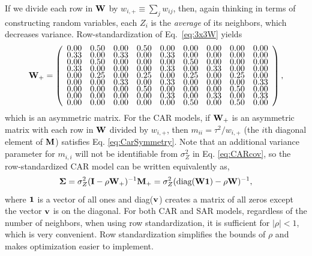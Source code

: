 \documentclass[11pt, titlepage]{article}\usepackage[]{graphicx}\usepackage[]{color}
\begin{document}
\begin{spacing}{1.9}
\begin{flushleft}
If we divide each row in $\mathbf{W}$ by $w_{i,+} \equiv \sum_j w_{ij}$, then, again thinking in terms of constructing random variables, each $Z_i$ is the \textit{average} of its neighbors, which decreases variance. Row-standardization of Eq.~\ref{eq:3x3W} yields
\begin{equation} \label{eq:W9plus}
\renewcommand\arraystretch{.5}
\bW_+ = \left(
\begin{array}{ccccccccc}
 0.00 & 0.50 & 0.00 & 0.50 & 0.00 & 0.00 & 0.00 & 0.00 & 0.00 \\ 
  0.33 & 0.00 & 0.33 & 0.00 & 0.33 & 0.00 & 0.00 & 0.00 & 0.00 \\ 
  0.00 & 0.50 & 0.00 & 0.00 & 0.00 & 0.50 & 0.00 & 0.00 & 0.00 \\ 
  0.33 & 0.00 & 0.00 & 0.00 & 0.33 & 0.00 & 0.33 & 0.00 & 0.00 \\ 
  0.00 & 0.25 & 0.00 & 0.25 & 0.00 & 0.25 & 0.00 & 0.25 & 0.00 \\ 
  0.00 & 0.00 & 0.33 & 0.00 & 0.33 & 0.00 & 0.00 & 0.00 & 0.33 \\ 
  0.00 & 0.00 & 0.00 & 0.50 & 0.00 & 0.00 & 0.00 & 0.50 & 0.00 \\ 
  0.00 & 0.00 & 0.00 & 0.00 & 0.33 & 0.00 & 0.33 & 0.00 & 0.33 \\ 
  0.00 & 0.00 & 0.00 & 0.00 & 0.00 & 0.50 & 0.00 & 0.50 & 0.00 \\ 
  
\end{array}
\right),
\end{equation}
which is an asymmetric matrix. For the CAR models, if $\mathbf{W}_+$ is an asymmetric matrix with each row in $\mathbf{W}$ divided by $w_{i,+}$, then $m_{ii} = \tau^2/w_{i,+}$ (the $i$th diagonal element of $\mathbf{M}$) satisfies Eq. \ref{eq:CarSymmetry}. Note that an additional variance parameter for $m_{i,i}$ will not be identifiable from $\sigma_Z^2$ in Eq. \ref{eq:CARcov}, so the row-standardized CAR model can be written equivalently as,
\begin{equation}\label{eq:bWone}
  \mbox{\boldmath $\Sigma$} = \sigma_Z^2(\mathbf{I} - \rho\mathbf{W}_+)^{-1}\mathbf{M}_+= \sigma_Z^2(\textrm{diag}(\mathbf{W}\mathbf{1}) - \rho\mathbf{W})^{-1},
\end{equation}
where $\mathbf{1}$ is a vector of all ones and diag($\mathbf{v}$) creates a matrix of all zeros except the vector $\mathbf{v}$ is on the diagonal. For both CAR and SAR models, regardless of the number of neighbors, when using row standardization, it is sufficient for $|\rho| < 1$, which is very convenient. Row standardization simplifies the bounds of $\rho$ and makes optimization easier to implement.  


\end{flushleft}
\end{spacing}
\end{document}
